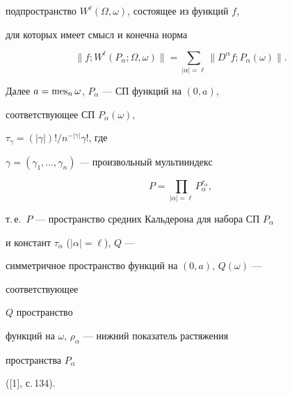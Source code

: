 подпространство $W^\ell(\Omega,\omega)$, состоящее из функций $f$, 


для которых имеет смысл и конечна норма 


$$ 


\|f;W^\ell(P_\alpha;\Omega,\omega)\|= 


\sum_{|\alpha|=\ell}\|D^\alpha f;P_\alpha(\omega)\|. 


$$ 


Далее $a=\operatorname{mes}_n\omega$, $P_\alpha$ --- СП функций на $(0,a)$, 


соответствующее СП $P_\alpha(\omega)$, 


$\tau_\gamma=(|\gamma|)!/n^{-|\gamma|}\gamma!$, где 


$\gamma=(\gamma_1,\dotsc,\gamma_n)$ --- произвольный мультииндекс 


$$ 


P=\prod_{|\alpha|=\ell}P^{\tau_\alpha}_\alpha, 


$$ 


т.\,е.~$P$ --- пространство средних Кальдерона для набора СП $P_\alpha$  


и констант $\tau_\alpha$ ($|\alpha|=\ell$), $Q$ --- 


симметричное пространство функций на $(0,a)$, $Q(\omega)$ --- 


соответствующее 


$Q$ пространство 


функций на $\omega$, $\rho_\alpha$ --- нижний показатель растяжения 


пространства $P_\alpha$ 


([1], с.\,134). 


 



